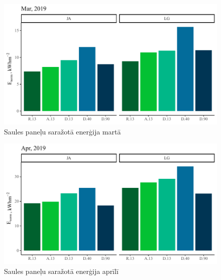 \begin{figure}[h]
    \centering
    \includegraphics[width=\linewidth]{figures/sol_month/mar_m_m2.pdf}
    \caption{Saules paneļu saražotā enerģija martā}
    \label{fig:mar_sum}
\end{figure}

\begin{figure}[h]
    \centering
    \includegraphics[width=\linewidth]{figures/sol_month/apr_m_m2.pdf}
    \caption{Saules paneļu saražotā enerģija aprīlī}
    \label{fig:apr_sum}
\end{figure}